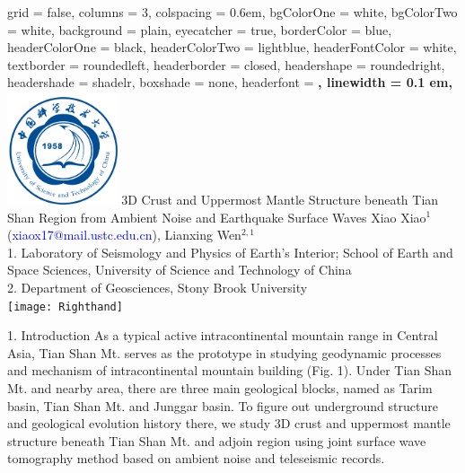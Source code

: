 \documentclass[
    landscape,      %
    paperwidth = 1200mm,
    paperheight = 900mm,
    fontscale = 0.4,
    margin = 1.7cm,
]{baposter}
\begin{document}
\begin{poster}{
    grid = false,            %
    columns = 3,
    colspacing = 0.6em,
    bgColorOne = white,
    bgColorTwo = white,
    background = plain,     %
    eyecatcher = true,      %
    borderColor = blue,
    headerColorOne = black,
    headerColorTwo = lightblue,
    headerFontColor = white,
    textborder = roundedleft,   %
    headerborder = closed,      %
    headershape = roundedright, %
    headershade = shadelr,      %
    boxshade = none,            %
    headerfont = \Large\bf\textsc,
    linewidth = 0.1 em,}
{\includegraphics[height=9em]{USTC_logo_blue.jpg}}
{\Huge{3D Crust and Uppermost Mantle Structure beneath Tian Shan Region from Ambient Noise and Earthquake Surface Waves}}
{
    \vspace{0.3em}
    Xiao Xiao$^1$ (\textcolor{blue}{xiaox17@mail.ustc.edu.cn}),
    Lianxing Wen$^{2,1}$ \\
    \vspace{0.3em}
    1. Laboratory of Seismology and Physics of Earth's Interior; School of Earth and Space Sciences, University of Science and Technology of China  \\
    2. Department of Geosciences, Stony Brook University  \\
}
{\texttt{[image: Righthand]}}
\vspace{0.4cm}

\begin{posterbox}[column=0, row=0]{1. Introduction}
\setlength{\parskip}{3pt}
As a typical active intracontinental mountain range in Central Asia, Tian
Shan Mt. serves as the prototype in studying geodynamic processes and mechanism
of intracontinental mountain building (Fig. 1). Under Tian Shan Mt. and nearby area,
there are three main geological blocks, named as Tarim basin, Tian Shan Mt.
and Junggar basin. To figure out underground structure and geological evolution history there,
we study 3D crust and uppermost mantle structure beneath Tian Shan Mt. and adjoin region
using joint surface wave tomography method based on ambient noise and teleseismic records.
\end{posterbox}


\end{poster}
\end{document}
